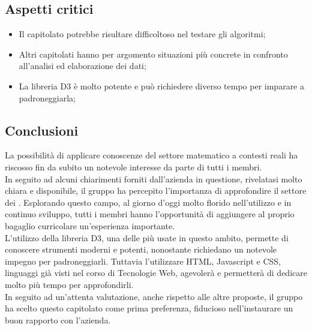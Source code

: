 \subsection{Aspetti critici}
\begin{itemize}
\item Il capitolato potrebbe risultare difficoltoso nel testare gli algoritmi;
\item Altri capitolati hanno per argomento situazioni più concrete in confronto all'analisi ed elaborazione dei dati;
\item La libreria D3 è molto potente e può richiedere diverso tempo per imparare a padroneggiarla; 
\end{itemize}

\subsection{Conclusioni}
La possibilità di applicare conoscenze del settore matematico a contesti reali ha riscosso fin da subito un notevole interesse da parte di tutti i membri.\\ In seguito ad alcuni chiarimenti forniti dall'azienda in questione, rivelatasi molto chiara e disponibile, il gruppo ha percepito l'importanza di approfondire il settore dei . Esplorando questo campo, al giorno d'oggi molto florido nell'utilizzo e in continuo sviluppo, tutti i membri hanno l'opportunità di aggiungere al proprio bagaglio curricolare un'esperienza importante.\\
L'utilizzo della libreria D3, una delle più usate in questo ambito, permette di conoscere strumenti moderni e potenti, nonostante richiedano un notevole impegno per padroneggiarli. Tuttavia l'utilizzare HTML, Javascript e CSS, linguaggi già visti nel corso di Tecnologie Web, agevolerà e permetterà di dedicare molto più tempo per approfondirli.\\In seguito ad un'attenta valutazione, anche rispetto alle altre proposte, il gruppo ha scelto questo capitolato come prima preferenza, fiducioso nell'instaurare un buon rapporto con l'azienda.
